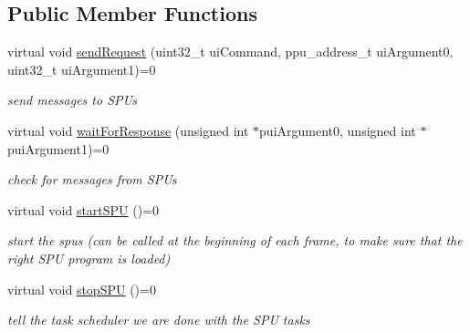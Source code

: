 \subsection*{Public Member Functions}
\begin{DoxyCompactItemize}
\item 
\mbox{\label{classbtThreadSupportInterface_a2c20a0b41be978c429e0b1a2b2f03152}} 
virtual void \hyperlink{classbtThreadSupportInterface_a2c20a0b41be978c429e0b1a2b2f03152}{send\+Request} (uint32\+\_\+t ui\+Command, ppu\+\_\+address\+\_\+t ui\+Argument0, uint32\+\_\+t ui\+Argument1)=0
\begin{DoxyCompactList}\small\item\em send messages to S\+P\+Us \end{DoxyCompactList}\item 
\mbox{\label{classbtThreadSupportInterface_abe3c8fa6998096a4804dbfd28882cfd9}} 
virtual void \hyperlink{classbtThreadSupportInterface_abe3c8fa6998096a4804dbfd28882cfd9}{wait\+For\+Response} (unsigned int $\ast$pui\+Argument0, unsigned int $\ast$pui\+Argument1)=0
\begin{DoxyCompactList}\small\item\em check for messages from S\+P\+Us \end{DoxyCompactList}\item 
virtual void \hyperlink{classbtThreadSupportInterface_a4d5139ae58302c0509c309ba9f3d2ca3}{start\+S\+PU} ()=0
\begin{DoxyCompactList}\small\item\em start the spus (can be called at the beginning of each frame, to make sure that the right S\+PU program is loaded) \end{DoxyCompactList}\item 
\mbox{\label{classbtThreadSupportInterface_a708419e843a0ebf0787983bcb50b8a83}} 
virtual void \hyperlink{classbtThreadSupportInterface_a708419e843a0ebf0787983bcb50b8a83}{stop\+S\+PU} ()=0
\begin{DoxyCompactList}\small\item\em tell the task scheduler we are done with the S\+PU tasks \end{DoxyCompactList}\item 
\mbox{\label{classbtThreadSupportInterface_a775436d1d71cc85639847d217aca78e6}} 

\end{DoxyCompactItemize}
